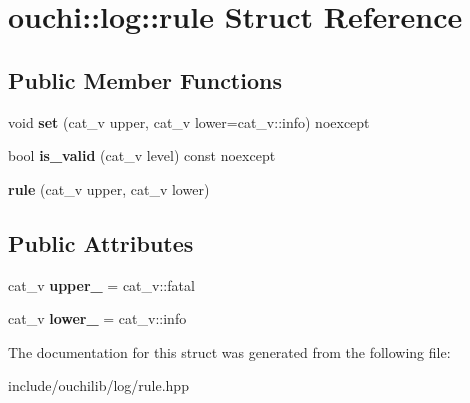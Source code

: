 \hypertarget{structouchi_1_1log_1_1rule}{}\section{ouchi\+::log\+::rule Struct Reference}
\label{structouchi_1_1log_1_1rule}
\subsection*{Public Member Functions}
\begin{DoxyCompactItemize}
\item 
\mbox{\label{structouchi_1_1log_1_1rule_a9a8a378fc3a2b5e7b0ba1bc6871dc1aa}} 
void {\bfseries set} (cat\+\_\+v upper, cat\+\_\+v lower=cat\+\_\+v\+::info) noexcept
\item 
\mbox{\label{structouchi_1_1log_1_1rule_afcf481be8707f5d75ab3bf4f12250bb3}} 
bool {\bfseries is\+\_\+valid} (cat\+\_\+v level) const noexcept
\item 
\mbox{\label{structouchi_1_1log_1_1rule_a188ef7d409b16b5ef8de4da99e11dd6e}} 
{\bfseries rule} (cat\+\_\+v upper, cat\+\_\+v lower)
\end{DoxyCompactItemize}
\subsection*{Public Attributes}
\begin{DoxyCompactItemize}
\item 
\mbox{\label{structouchi_1_1log_1_1rule_ac0b7d5c65fcf8046ee31b570ae5589ee}} 
cat\+\_\+v {\bfseries upper\+\_\+} = cat\+\_\+v\+::fatal
\item 
\mbox{\label{structouchi_1_1log_1_1rule_a8b04d6b1d7e3c1d545c0b948aca17012}} 
cat\+\_\+v {\bfseries lower\+\_\+} = cat\+\_\+v\+::info
\end{DoxyCompactItemize}


The documentation for this struct was generated from the following file\+:\begin{DoxyCompactItemize}
\item 
include/ouchilib/log/rule.\+hpp\end{DoxyCompactItemize}
